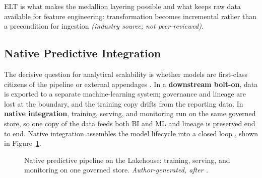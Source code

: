 ELT is what makes the medallion layering possible and what keeps raw data available for feature engineering: transformation becomes incremental rather than a precondition for ingestion \parencite{databricks2022} \textit{(industry source; not peer-reviewed)}.

\subsection{Native Predictive Integration}
\label{subsec:ch2-native-ml}

The decisive question for analytical scalability is whether models are first-class citizens of the pipeline or external appendages \parencite{armbrust2021}. In a \textbf{downstream bolt-on}, data is exported to a separate machine-learning system; governance and lineage are lost at the boundary, and the training copy drifts from the reporting data. In \textbf{native integration}, training, serving, and monitoring run on the same governed store, so one copy of the data feeds both BI and ML and lineage is preserved end to end. Native integration assembles the model lifecycle into a closed loop \parencite{kreuzberger2023}, shown in Figure~\ref{fig:ch2-native-ml-loop}.

\begin{figure}[H]
\centering
{}
\caption{Native predictive pipeline on the Lakehouse: training, serving, and monitoring on one governed store. \textit{Author-generated, after \parencite{kreuzberger2023}.}}
\label{fig:ch2-native-ml-loop}
\end{figure}


